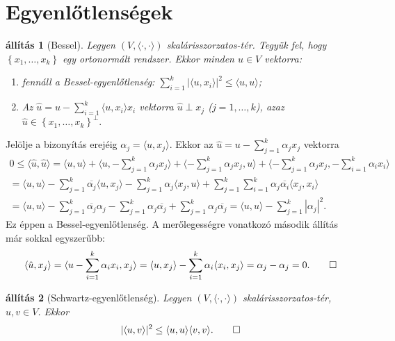 \documentclass[a4paper, showtrims]{memoir}
\makeatletter
\renewenvironment{proof}[1][\proofname]
    {\par\pushQED{\qed}%
    \normalfont \topsep6\p@\@plus6\p@\relax
    \trivlist
    \item[\hskip\labelsep
        \itshape
    #1\@addpunct{:}]\ignorespaces}
    {\popQED\endtrivlist\@endpefalse}
\theoremstyle{plain}
\newtheorem{proposition}{állítás}[chapter]
\theoremstyle{remark}
\theoremstyle{definition}
\DeclareMathOperator{\lin}{lin}
\newcommand{\ip}[2]{\langle#1,#2\rangle}
\makeatother
\begin{document}
\section{Egyenlőtlenségek}
\begin{proposition}[Bessel]\label{pr:Bessel}
	Legyen $\left( V,\ip{\cdot}{\cdot} \right)$ skalárisszorzatos-tér.
	Tegyük fel, hogy $\left\{ x_1,\ldots,x_k \right\}$ egy ortonormált rendszer.
	Ekkor minden $u\in V$ vektorra:
	\begin{enumerate}
		\item
		      fennáll a  \emph{Bessel-egyenlőtlenség:}
		      $\sum_{i=1}^k|\ip{u}{x_i}|^2\leq\ip{u}{u}$;
		\item
		      Az
		      \(
		      \hat{u}=u-\sum_{i=1}^k\ip{u}{x_i}x_i
		      \)
		      vektorra $\hat{u}\perp x_j$
		      ($j=1,\ldots,k$), azaz
		      \(
		      \hat{u}\in
		      \left\{ x_1,\ldots,x_k \right\}^\perp
		      .
		      \)
		      \qedhere
	\end{enumerate}
\end{proposition}
\begin{proof}
	Jelölje a bizonyítás erejéig
	\begin{math}
		\alpha_j=\ip{u}{x_j}.
	\end{math}
	Ekkor az $\hat{u}=u-\sum_{j=1}^k\alpha_jx_j$ vektorra
	\begin{multline*}
		0
		\leq
		\ip{\hat{u}}{\hat{u}}
		=
		\ip{u}{u}+\ip{u}{-\sum_{j=1}^k\alpha_jx_j}+\ip{-\sum_{j=1}^k\alpha_jx_j}{u}+\ip{-\sum_{j=1}^k\alpha_jx_j}{-\sum_{i=1}^k\alpha_ix_i}
		\\
		=
		\ip{u}{u}-\sum_{j=1}^k\overline{\alpha_j}\ip{u}{x_j}-\sum_{j=1}^k\alpha_j\ip{x_j}{u}+\sum_{j=1}^k\sum_{i=1}^k\alpha_j\overline{\alpha_i}\ip{x_j}{x_i}
		\\
		=
		\ip{u}{u}-\sum_{j=1}^k\overline{\alpha_j}\alpha_j-\sum_{j=1}^k\alpha_j\overline{\alpha_j}+\sum_{j=1}^k\alpha_j\overline{\alpha_j}
		=\ip{u}{u}-\sum_{j=1}^k|\alpha_j|^2.
	\end{multline*}
	Ez éppen a Bessel-egyenlőtlenség.
	A merőlegességre vonatkozó második állítás már sokkal egyszerűbb:
	\[
		\ip{\hat{u}}{x_j}
		=
		\ip{u-\sum_{i=1}^k\alpha_ix_i}{x_j}
		=
		\ip{u}{x_j}-\sum_{i=1}^k\alpha_i\ip{x_i}{x_j}
		=
		\alpha_j-\alpha_j
		=
		0.
		\qedhere
	\]
\end{proof}
\begin{proposition}[Schwartz-egyenlőtlenség]
	Legyen $\left( V,\ip{\cdot}{\cdot} \right)$ skalárisszorzatos-tér,
	$u,v\in V$.
	Ekkor
	\[
		|\ip{u}{v}|^2\leq \ip{u}{u}\ip{v}{v}.\qedhere
	\]
\end{proposition}
\end{document}
